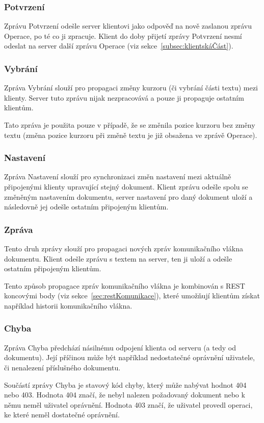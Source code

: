 \subsubsection{Potvrzení} %

Zprávu Potvrzení odešle server klientovi jako odpověď na nově zaslanou zprávu Operace, po té co ji zpracuje.
Klient do doby přijetí zprávy Potvrzení nesmí odeslat na server další zprávu Operace (viz sekce~\ref{subsec:klientskáČást}).

\subsubsection{Vybrání} %

Zpráva Vybrání slouží pro propagaci změny kurzoru (či vybrání části textu) mezi klienty.
Server tuto zprávu nijak nezpracovává a pouze ji propaguje ostatním klientům.

Tato zpráva je použita pouze v případě, že se změnila pozice kurzoru bez změny textu (změna pozice kurzoru při změně textu je již obsažena ve zprávě Operace).

\subsubsection{Nastavení} %

Zpráva Nastavení slouží pro synchronizaci změn nastavení mezi aktuálně připojenými klienty upravující stejný dokument.
Klient zprávu odešle spolu se změněným nastavením dokumentu, server nastavení pro daný dokument uloží a následovně jej odešle ostatním připojeným klientům.

\subsubsection{Zpráva} %

Tento druh zprávy slouží pro propagaci nových zpráv komunikačního vlákna dokumentu.
Klient odešle zprávu s textem na server, ten ji uloží a odešle ostatním připojeným klientům.

Tento způsob propagace zpráv komunikačního vlákna je kombinován s \gls{REST} koncovými body (viz sekce~\ref{sec:restKomunikace}), které umožňují klientům získat například historii komunikačního vlákna.

\subsubsection{Chyba} %

Zpráva Chyba předchází násilnému odpojení klienta od serveru (a tedy od dokumentu).
Její příčinou může být například nedostatečné oprávnění uživatele, či nenalezení příslušného dokumentu.

Součástí zprávy Chyba je stavový kód chyby, který může nabývat hodnot 404 nebo 403.
Hodnota 404 značí, že nebyl nalezen požadovaný dokument nebo k němu neměl uživatel oprávnění.
Hodnota 403 značí, že uživatel provedl operaci, ke které neměl dostatečné oprávnění.
